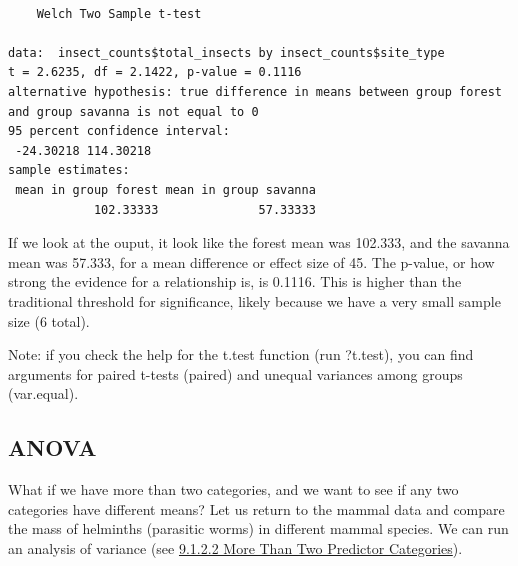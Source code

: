 \documentclass[
  letterpaper,
  DIV=11,
  numbers=noendperiod]{scrreprt}
\newenvironment{Shaded}{\begin{snugshade}}{\end{snugshade}}
\newcommand{\AttributeTok}[1]{\textcolor[rgb]{0.40,0.45,0.13}{#1}}
\newcommand{\DocumentationTok}[1]{\textcolor[rgb]{0.37,0.37,0.37}{\textit{#1}}}
\newcommand{\FunctionTok}[1]{\textcolor[rgb]{0.28,0.35,0.67}{#1}}
\newcommand{\NormalTok}[1]{\textcolor[rgb]{0.00,0.23,0.31}{#1}}
\newcommand{\OtherTok}[1]{\textcolor[rgb]{0.00,0.23,0.31}{#1}}
\newcommand{\SpecialCharTok}[1]{\textcolor[rgb]{0.37,0.37,0.37}{#1}}
\begin{document}
\begin{Shaded}
\end{Shaded}

\begin{verbatim}

    Welch Two Sample t-test

data:  insect_counts$total_insects by insect_counts$site_type
t = 2.6235, df = 2.1422, p-value = 0.1116
alternative hypothesis: true difference in means between group forest and group savanna is not equal to 0
95 percent confidence interval:
 -24.30218 114.30218
sample estimates:
 mean in group forest mean in group savanna 
            102.33333              57.33333 
\end{verbatim}

If we look at the ouput, it look like the forest mean was 102.333, and
the savanna mean was 57.333, for a mean difference or effect size of 45.
The p-value, or how strong the evidence for a relationship is, is
0.1116. This is higher than the traditional threshold for significance,
likely because we have a very small sample size (6 total).

Note: if you check the help for the t.test function (run ?t.test), you
can find arguments for paired t-tests (paired) and unequal variances
among groups (var.equal).

\subsection{ANOVA}\label{anova}

What if we have more than two categories, and we want to see if any two
categories have different means? Let us return to the mammal data and
compare the mass of helminths (parasitic worms) in different mammal
species. We can run an analysis of variance (see
\hyperref[sec-anova]{9.1.2.2 More Than Two Predictor Categories}).

\begin{Shaded}
\end{Shaded}
\end{document}
